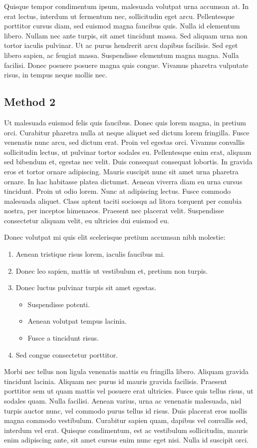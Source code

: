 \documentclass[12pt, a4paper]{article}
\begin{document}
Quisque tempor condimentum ipsum, malesuada volutpat urna accumsan at. In erat lectus, interdum ut fermentum nec, sollicitudin eget arcu. Pellentesque porttitor cursus diam, sed euismod magna faucibus quis. Nulla id elementum libero. Nullam nec ante turpis, sit amet tincidunt massa. Sed aliquam urna non tortor iaculis pulvinar. Ut ac purus hendrerit arcu dapibus facilisis. Sed eget libero sapien, ac feugiat massa. Suspendisse elementum magna magna. Nulla facilisi. Donec posuere posuere magna quis congue. Vivamus pharetra vulputate risus, in tempus neque mollis nec.

\subsection{Method 2}
\label{subsec:method:2}

Ut malesuada euismod felis quis faucibus. Donec quis lorem magna, in pretium orci. Curabitur pharetra nulla at neque aliquet sed dictum lorem fringilla. Fusce venenatis nunc arcu, sed dictum erat. Proin vel egestas orci. Vivamus convallis sollicitudin lectus, ut pulvinar tortor sodales eu. Pellentesque enim erat, aliquam sed bibendum et, egestas nec velit. Duis consequat consequat lobortis. In gravida eros et tortor ornare adipiscing. Mauris suscipit nunc sit amet urna pharetra ornare. In hac habitasse platea dictumst. Aenean viverra diam eu urna cursus tincidunt. Proin ut odio lorem. Nunc at adipiscing lectus. Fusce commodo malesuada aliquet. Class aptent taciti sociosqu ad litora torquent per conubia nostra, per inceptos himenaeos. Praesent nec placerat velit. Suspendisse consectetur aliquam velit, eu ultricies dui euismod eu.

Donec volutpat mi quis elit scelerisque pretium accumsan nibh molestie:
\begin{enumerate}
  \item Aenean tristique risus lorem, iaculis faucibus mi.
  \item Donec leo sapien, mattis ut vestibulum et, pretium non turpis.
  \item Donec luctus pulvinar turpis sit amet egestas.
  \begin{itemize}
    \item Suspendisse potenti.
    \item Aenean volutpat tempus lacinia.
    \item Fusce a tincidunt risus.
  \end{itemize}
  \item Sed congue consectetur porttitor.
\end{enumerate}
Morbi nec tellus non ligula venenatis mattis eu fringilla libero. Aliquam gravida tincidunt lacinia. Aliquam nec purus id mauris gravida facilisis. Praesent porttitor sem ut quam mattis vel posuere erat ultricies. Fusce quis tellus risus, ut sodales quam. Nulla facilisi. Aenean varius, urna ac venenatis malesuada, nisl turpis auctor nunc, vel commodo purus tellus id risus. Duis placerat eros mollis magna commodo vestibulum. Curabitur sapien quam, dapibus vel convallis sed, interdum vel erat. Quisque condimentum, est ac vestibulum sollicitudin, mauris enim adipiscing ante, sit amet cursus enim nunc eget nisi. Nulla id suscipit orci.
\end{document}
